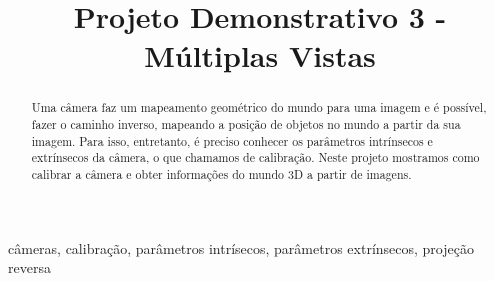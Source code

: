 \documentclass[conference]{IEEEtran}
\begin{document}
\title{Projeto Demonstrativo 3 - Múltiplas Vistas}

\author{
}

\maketitle

\begin{abstract}
Uma câmera faz um mapeamento geométrico do mundo para uma imagem e é possível, fazer o caminho inverso, mapeando a posição de objetos no mundo a partir da sua imagem. Para isso, entretanto, é preciso conhecer os parâmetros intrínsecos e extrínsecos da câmera, o que chamamos de calibração. Neste projeto mostramos como calibrar a câmera e obter informações do mundo 3D a partir de imagens.
\end{abstract}

\begin{IEEEkeywords}
câmeras, calibração, parâmetros intrísecos, parâmetros extrínsecos, projeção reversa
\end{IEEEkeywords}
\end{document}
